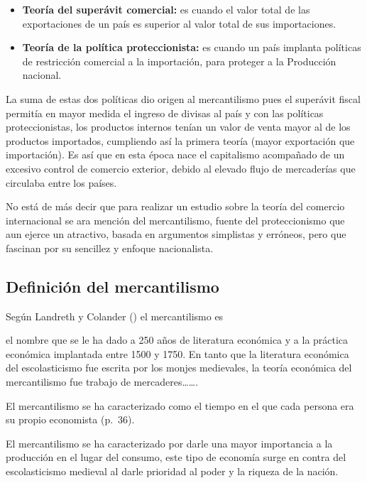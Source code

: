 \documentclass[
  jou,
  floatsintext,
  longtable,
  a4paper,
  nolmodern,
  notxfonts,
  notimes,
  colorlinks=true,linkcolor=blue,citecolor=blue,urlcolor=blue]{apa7}
\providecommand{\tightlist}{%
  \setlength{\itemsep}{0pt}\setlength{\parskip}{0pt}}
\begin{document}
\begin{itemize}
\tightlist
\item
  \hspace{0pt} \textbf{Teoría del superávit comercial:} es cuando el
  valor total de las exportaciones de un país es superior al valor total
  de sus importaciones.
\item
  \hspace{0pt} \textbf{Teoría de la política proteccionista:} es cuando
  un país implanta políticas de restricción comercial a la importación,
  para proteger a la Producción nacional.
\end{itemize}

La suma de estas dos políticas dio origen al mercantilismo pues el
superávit fiscal permitía en mayor medida el ingreso de divisas al país
y con las políticas proteccionistas, los productos internos tenían un
valor de venta mayor al de los productos importados, cumpliendo así la
primera teoría (mayor exportación que importación). Es así que en esta
época nace el capitalismo acompañado de un excesivo control de comercio
exterior, debido al elevado flujo de mercaderías que circulaba entre los
países.

No está de más decir que para realizar un estudio sobre la teoría del
comercio internacional se ara mención del mercantilismo, fuente del
proteccionismo que aun ejerce un atractivo, basada en argumentos
simplistas y erróneos, pero que fascinan por su sencillez y enfoque
nacionalista.

\subsection{Definición del
mercantilismo}\label{definiciuxf3n-del-mercantilismo}

Según Landreth y Colander
() el
mercantilismo es

el nombre que se le ha dado a 250 años de literatura económica y a la
práctica económica implantada entre 1500 y 1750. En tanto que la
literatura económica del escolasticismo fue escrita por los monjes
medievales, la teoría económica del mercantilismo fue trabajo de
mercaderes\ldots\ldots.

El mercantilismo se ha caracterizado como el tiempo en el que cada
persona era su propio economista (p.~36).

El mercantilismo se ha caracterizado por darle una mayor importancia a
la producción en el lugar del consumo, este tipo de economía surge en
contra del escolasticismo medieval al darle prioridad al poder y la
riqueza de la nación.
\end{document}
